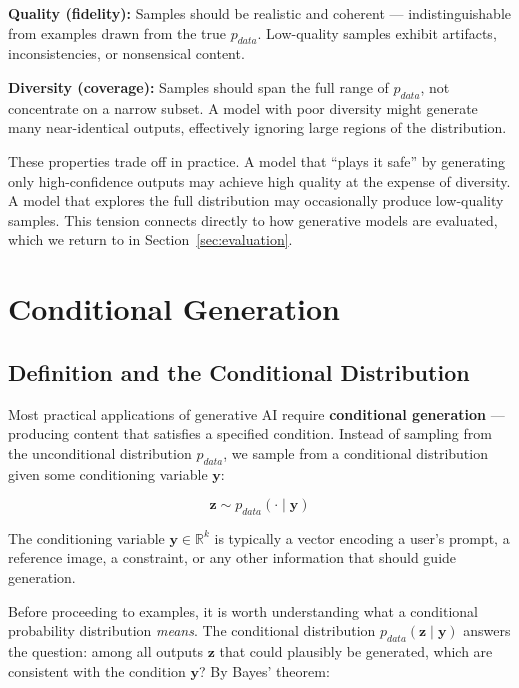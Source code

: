 \documentclass{book}
\begin{document}
\textbf{Quality (fidelity):} Samples should be realistic and coherent ---
indistinguishable from examples drawn from the true $p_{data}$. Low-quality
samples exhibit artifacts, inconsistencies, or nonsensical content.

\textbf{Diversity (coverage):} Samples should span the full range of $p_{data}$,
not concentrate on a narrow subset. A model with poor diversity might generate
many near-identical outputs, effectively ignoring large regions of the
distribution.

These properties trade off in practice. A model that ``plays it safe'' by
generating only high-confidence outputs may achieve high quality at the expense
of diversity. A model that explores the full distribution may occasionally
produce low-quality samples. This tension connects directly to how generative
models are evaluated, which we return to in Section~\ref{sec:evaluation}.

\section{Conditional Generation}

\subsection{Definition and the Conditional Distribution}

Most practical applications of generative AI require \textbf{conditional
generation} --- producing content that satisfies a specified condition. Instead
of sampling from the unconditional distribution $p_{data}$, we sample from a
conditional distribution given some conditioning variable $\mathbf{y}$:

\begin{equation}
\mathbf{z} \sim p_{data}(\cdot \mid \mathbf{y})
\end{equation}

The conditioning variable $\mathbf{y} \in \mathbb{R}^k$ is typically a vector
encoding a user's prompt, a reference image, a constraint, or any other
information that should guide generation.

Before proceeding to examples, it is worth understanding what a conditional
probability distribution \emph{means}. The conditional distribution
$p_{data}(\mathbf{z} \mid \mathbf{y})$ answers the question: among all outputs
$\mathbf{z}$ that could plausibly be generated, which are consistent with the
condition $\mathbf{y}$? By Bayes' theorem:
\end{document}
